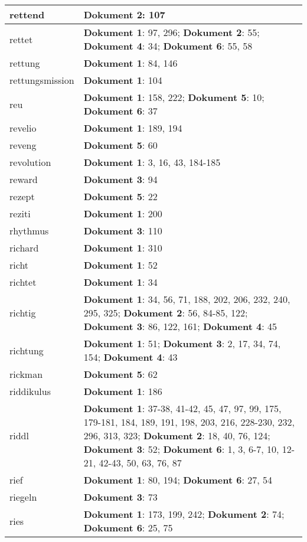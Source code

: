 \documentclass[a5paper]{article}
\begin{document}
\begin{longtable}[l]{|l|p{3in}|}
\hline
rettend & \textbf{Dokument 2}: 107 \\
\hline
rettet & \textbf{Dokument 1}: 97, 296; \textbf{Dokument 2}: 55; \textbf{Dokument 4}: 34; \textbf{Dokument 6}: 55, 58 \\
\hline
rettung & \textbf{Dokument 1}: 84, 146 \\
\hline
rettungsmission & \textbf{Dokument 1}: 104 \\
\hline
reu & \textbf{Dokument 1}: 158, 222; \textbf{Dokument 5}: 10; \textbf{Dokument 6}: 37 \\
\hline
revelio & \textbf{Dokument 1}: 189, 194 \\
\hline
reveng & \textbf{Dokument 5}: 60 \\
\hline
revolution & \textbf{Dokument 1}: 3, 16, 43, 184-185 \\
\hline
reward & \textbf{Dokument 3}: 94 \\
\hline
rezept & \textbf{Dokument 5}: 22 \\
\hline
reziti & \textbf{Dokument 1}: 200 \\
\hline
rhythmus & \textbf{Dokument 3}: 110 \\
\hline
richard & \textbf{Dokument 1}: 310 \\
\hline
richt & \textbf{Dokument 1}: 52 \\
\hline
richtet & \textbf{Dokument 1}: 34 \\
\hline
richtig & \textbf{Dokument 1}: 34, 56, 71, 188, 202, 206, 232, 240, 295, 325; \textbf{Dokument 2}: 56, 84-85, 122; \textbf{Dokument 3}: 86, 122, 161; \textbf{Dokument 4}: 45 \\
\hline
richtung & \textbf{Dokument 1}: 51; \textbf{Dokument 3}: 2, 17, 34, 74, 154; \textbf{Dokument 4}: 43 \\
\hline
rickman & \textbf{Dokument 5}: 62 \\
\hline
riddikulus & \textbf{Dokument 1}: 186 \\
\hline
riddl & \textbf{Dokument 1}: 37-38, 41-42, 45, 47, 97, 99, 175, 179-181, 184, 189, 191, 198, 203, 216, 228-230, 232, 296, 313, 323; \textbf{Dokument 2}: 18, 40, 76, 124; \textbf{Dokument 3}: 52; \textbf{Dokument 6}: 1, 3, 6-7, 10, 12-21, 42-43, 50, 63, 76, 87 \\
\hline
rief & \textbf{Dokument 1}: 80, 194; \textbf{Dokument 6}: 27, 54 \\
\hline
riegeln & \textbf{Dokument 3}: 73 \\
\hline
ries & \textbf{Dokument 1}: 173, 199, 242; \textbf{Dokument 2}: 74; \textbf{Dokument 6}: 25, 75 \\

\end{longtable}
\end{document}
